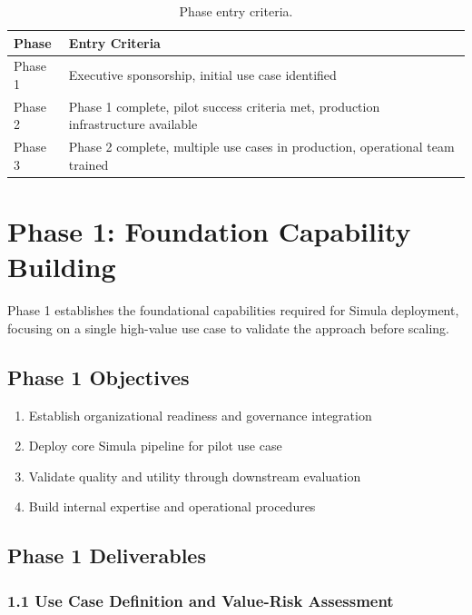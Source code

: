 \documentclass[12pt,a4paper,twoside]{report}
\begin{document}
\begin{table}[htbp]
\centering
\caption{Phase entry criteria.}
\label{tab:phase-entry}
\footnotesize
\begin{tabularx}{\textwidth}{@{}l X@{}}
\toprule
\textbf{Phase} & \textbf{Entry Criteria} \\
\midrule
Phase 1 & Executive sponsorship, initial use case identified \\
Phase 2 & Phase 1 complete, pilot success criteria met, production infrastructure available \\
Phase 3 & Phase 2 complete, multiple use cases in production, operational team trained \\
\bottomrule
\end{tabularx}
\end{table}


\section{Phase 1: Foundation Capability Building}

Phase 1 establishes the foundational capabilities required for Simula deployment,
focusing on a single high-value use case to validate the approach before scaling.

\subsection{Phase 1 Objectives}

\begin{enumerate}
\item Establish organizational readiness and governance integration
\item Deploy core Simula pipeline for pilot use case
\item Validate quality and utility through downstream evaluation
\item Build internal expertise and operational procedures
\end{enumerate}

\subsection{Phase 1 Deliverables}

\subsubsection{1.1 Use Case Definition and Value-Risk Assessment}
\end{document}
